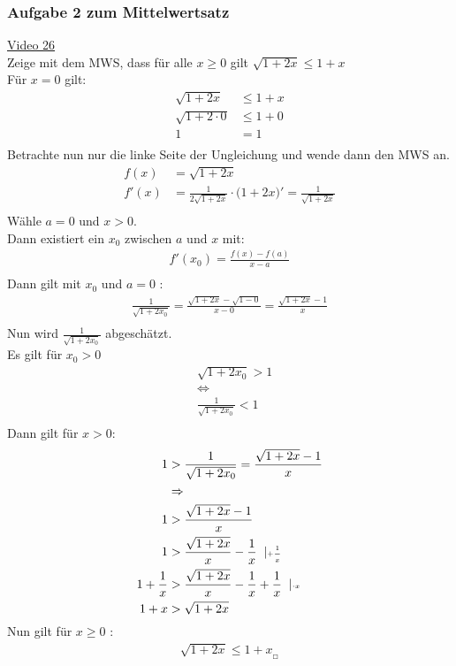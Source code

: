 \subsubsection{Aufgabe 2 zum Mittelwertsatz}
\href{https://youtu.be/uzNiQL4wJ-M}{Video 26}\\
Zeige mit dem MWS, dass für alle $ x\geq 0 $ gilt $ \sqrt{1+2x}\leq 1+x $\\
Für $ x=0 $ gilt:\\
\begin{align*}
\sqrt{1+2x}&\leq 1+x\\
\sqrt{1+2\cdot 0}&\leq 1+0\\
1&=1\\
\end{align*}
Betrachte nun nur die linke Seite der Ungleichung und wende dann den MWS an.\\
\begin{align*}
f(x)&=\sqrt{1+2x}\\
f'(x)&=\frac{1}{2\sqrt{1+2x}}\cdot \big(1+2x\big)'=\frac{1}{\sqrt{1+2x}}\\
\end{align*}
Wähle $ a=0 $ und $ x>0 $.\\
Dann existiert ein $ x_0 $ zwischen $ a $ und $ x $ mit:\\
\begin{align*}
f'(x_0)=\frac{f(x)-f(a)}{x-a}\\
\end{align*}
Dann gilt mit $ x_0 $ und $ a=0 $ :\\
\begin{align*}
\frac{1}{\sqrt{1+2x_0}}=\frac{\sqrt{1+2x}-\sqrt{1-0}}{x-0}=\frac{\sqrt{1+2x}-1}{x}\\
\end{align*}
Nun wird $ \frac{1}{\sqrt{1+2x_0}} $ abgeschätzt.\\
Es gilt für $ x_0>0 $\\
\begin{align*}
&\sqrt{1+2x_0}>1\\
&\Leftrightarrow\\
&\frac{1}{\sqrt{1+2x_0}}<1\\
\end{align*}
Dann gilt für $ x>0 $:\\
\begin{align*}
1&>\frac{1}{\sqrt{1+2x_0}}=\frac{\sqrt{1+2x}-1}{x}\\
&\Rightarrow\\
1&>\frac{\sqrt{1+2x}-1}{x}\\
1&>\frac{\sqrt{1+2x}}{x}-\frac{1}{x}\;\;|\text{\tiny $ +\frac{1}{x} $ }\\
1+\frac{1}{x}&>\frac{\sqrt{1+2x}}{x}-\frac{1}{x}+\frac{1}{x}\;\;|\text{\tiny $ \cdot x $ }\\
1+x&>\sqrt{1+2x}\\
\end{align*}
Nun gilt für $ x\geq  0 $ :\\
\begin{align*}
\sqrt{1+2x}\leq 1+x_{_{\Square}}
\end{align*}
